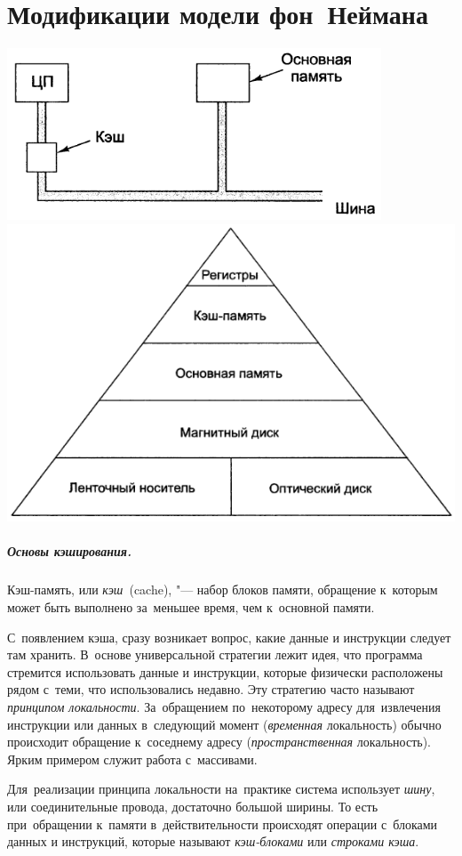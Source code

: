 \section{Модификации модели фон~Неймана}
\vspace{-1em}\begin{flushleft}
  \includegraphics[width=0.45\columnwidth]{images/cache.png}\hfill%
  \includegraphics[width=0.45\columnwidth]{images/memory.png}
\end{flushleft}



\subparagraph{Основы кэширования.}
Кэш-память, или \textit{кэш}~(\textenglish{cache}), "--- набор блоков памяти, обращение к~которым может быть выполнено за~меньшее время, чем к~основной памяти.

С~появлением кэша, сразу возникает вопрос, какие данные и инструкции следует там хранить. В~основе универсальной стратегии лежит идея, что программа стремится использовать данные и инструкции, которые физически расположены рядом с~теми, что использовались недавно. Эту стратегию часто называют \emph{принципом локальности}. За~обращением по~некоторому адресу для~извлечения инструкции или данных в~следующий момент (\emph{временная} локальность) обычно происходит обращение к~соседнему адресу (\emph{пространственная} локальность). Ярким примером служит работа с~массивами.

Для~реализации принципа локальности на~практике система использует \emph{шину}, или соединительные провода, достаточно большой ширины. То есть при~обращении к~памяти в~действительности происходят операции с~блоками данных и инструкций, которые называют \emph{кэш-блоками} или \emph{строками кэша}.

